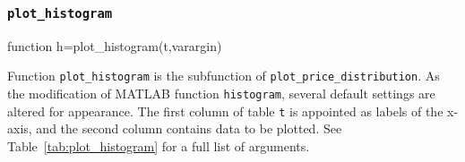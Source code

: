 \documentclass[10pt]{article}
\newcommand{\matlab}{\textsc{MATLAB}}
\numberwithin{equation}{section}
\numberwithin{table}{section}
\numberwithin{figure}{section}
\begin{document}
\subsubsection{\texttt{plot\_histogram}}\label{func:plot_histogram}

\begin{Code}
function h=plot_histogram(t,varargin)
\end{Code}

Function \verb!plot_histogram! is the subfunction of \verb!plot_price_distribution!. As the modification of \matlab{} function \verb!histogram!, several default settings are altered for appearance. The first column of table \verb!t! is appointed as labels of the x-axis, and the second column contains data to be plotted. See Table~\ref{tab:plot_histogram} for a full list of arguments.
\end{document}
